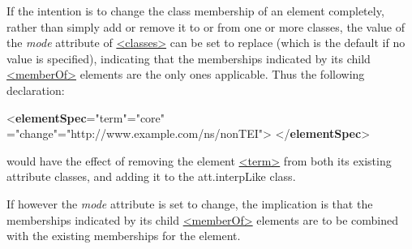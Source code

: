 If the intention is to change the class membership of an element completely, rather than simply add or remove it to or from one or more classes, the value of the {\itshape mode} attribute of \hyperref[TEI.classes]{<classes>} can be set to replace (which is the default if no value is specified), indicating that the memberships indicated by its child \hyperref[TEI.memberOf]{<memberOf>} elements are the only ones applicable. Thus the following declaration: \par\bgroup{}\exampleFont \begin{shaded}\noindent\mbox{}{<\textbf{elementSpec}\hspace*{1em}{ident}="{term}"\hspace*{1em}{module}="{core}"\mbox{}\newline 
\hspace*{1em}{mode}="{change}"\hspace*{1em}{ns}="{http://www.example.com/ns/nonTEI}">}\mbox{}\newline 
{}\mbox{}\newline 
\hspace*{1em}\mbox{}\newline 
{}\mbox{}\newline 
{</\textbf{elementSpec}>}\end{shaded}\egroup\par \noindent  would have the effect of removing the element \hyperref[TEI.term]{<term>} from both its existing attribute classes, and adding it to the \textsf{att.interpLike} class.\par
If however the {\itshape mode} attribute is set to change, the implication is that the memberships indicated by its child \hyperref[TEI.memberOf]{<memberOf>} elements are to be combined with the existing memberships for the element.\par
